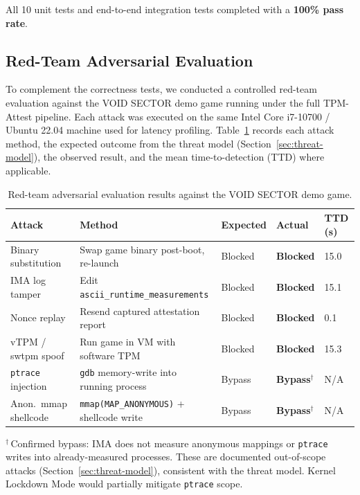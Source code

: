 \documentclass[11pt]{article}
\begin{document}
All 10 unit tests and end-to-end integration tests completed with a \textbf{100\% pass rate}.

\subsection{Red-Team Adversarial Evaluation}
\label{sec:redteam}

To complement the correctness tests, we conducted a controlled red-team evaluation against the VOID SECTOR demo game running under the full TPM-Attest pipeline. Each attack was executed on the same Intel Core i7-10700 / Ubuntu 22.04 machine used for latency profiling. Table~\ref{tab:redteam} records each attack method, the expected outcome from the threat model (Section~\ref{sec:threat-model}), the observed result, and the mean time-to-detection (TTD) where applicable.

\begin{table}[h]
\centering
\caption{Red-team adversarial evaluation results against the VOID SECTOR demo game.}
\label{tab:redteam}
\renewcommand{\arraystretch}{1.2}
\begin{tabular}{@{}p{3.0cm}p{2.8cm}p{1.5cm}p{1.5cm}p{1.8cm}@{}}
\toprule
\textbf{Attack} & \textbf{Method} & \textbf{Expected} & \textbf{Actual} & \textbf{TTD (s)} \\
\midrule
Binary substitution   & Swap game binary post-boot, re-launch                  & Blocked  & \textbf{Blocked}  & 15.0 \\
IMA log tamper        & Edit \texttt{ascii\_runtime\allowbreak\_measurements}  & Blocked  & \textbf{Blocked}  & 15.1 \\
Nonce replay          & Resend captured attestation report                     & Blocked  & \textbf{Blocked}  &  0.1 \\
vTPM / swtpm spoof    & Run game in VM with software TPM                       & Blocked  & \textbf{Blocked}  & 15.3 \\
\texttt{ptrace} injection & \texttt{gdb} memory-write into running process     & Bypass   & \textbf{Bypass}$^\dagger$   & N/A  \\
Anon.\ mmap shellcode & \texttt{mmap(MAP\_ANONYMOUS)} + shellcode write        & Bypass   & \textbf{Bypass}$^\dagger$   & N/A  \\
\bottomrule
\end{tabular}
\vspace{0.3em}
{\footnotesize $^\dagger$\,Confirmed bypass: IMA does not measure anonymous mappings or \texttt{ptrace} writes into already-measured processes. These are documented out-of-scope attacks (Section~\ref{sec:threat-model}), consistent with the threat model. Kernel Lockdown Mode would partially mitigate \texttt{ptrace} scope.}
\end{table}
\end{document}

